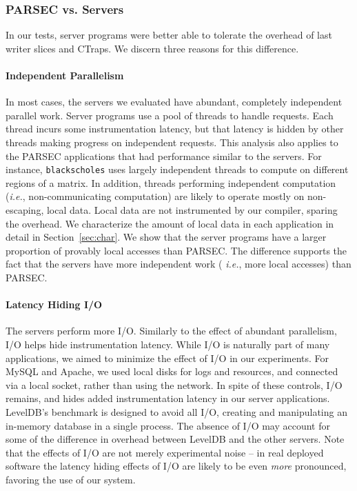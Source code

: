 \documentclass[preprint,9pt]{sigplanconf}
\newcommand{\ctraps}{CTraps\xspace}
\begin{document}
\subsubsection{PARSEC vs. Servers}
\label{sec:eval:parsecserver}
In our tests, server programs were better able to tolerate the overhead of
last writer slices and \ctraps.   We discern three reasons for this difference.

\paragraph{Independent Parallelism}
In most cases, the servers we evaluated have abundant, completely independent
parallel work.  Server programs use a pool of threads to handle requests.
Each thread incurs some instrumentation latency, but that latency is hidden by
other threads making progress on independent requests.  This analysis also
applies to the PARSEC applications that had performance similar to the servers.
For instance, {\tt blackscholes} uses largely independent threads to compute on
different regions of a matrix.  In addition, threads performing independent
computation ({\em i.e.}, non-communicating computation) are likely to operate
mostly on non-escaping, local data.  Local data are not instrumented by our
compiler, sparing the overhead.  We characterize the amount of local data in
each application in detail in Section~\ref{sec:char}.  We show that the server
programs have a larger proportion of provably local accesses than PARSEC.  The
difference supports the fact that the servers have more independent work ({\em
i.e.}, more local accesses) than PARSEC. 


\paragraph{Latency Hiding I/O}
The servers perform more I/O.  Similarly to the effect of abundant parallelism,
I/O helps hide instrumentation latency.  While I/O is naturally part of many
applications, we aimed to minimize the effect of I/O in our experiments.  For
MySQL and Apache, we used local disks for logs and resources, and connected via
a local socket, rather than using the network.  In spite of these controls, I/O
remains, and hides added instrumentation latency in our server applications.
LevelDB's benchmark is designed to avoid all I/O, creating and manipulating an
in-memory database in a single process.  The absence of I/O may account for some
of the difference in overhead between LevelDB and the other servers.  Note that
the effects of I/O are not merely experimental noise -- in real deployed
software the latency hiding effects of I/O are likely to be even {\em more}
pronounced, favoring the use of our system.
\end{document}

